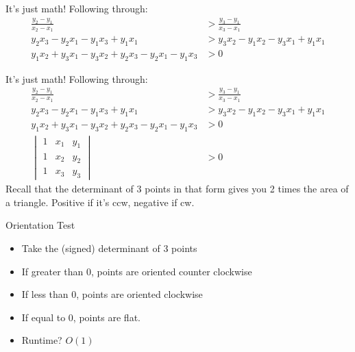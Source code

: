 \documentclass[aspectratio=169]{beamer}
\begin{document}
\begin{frame}{It's just math!}
    Following through:
    \begin{align*}
        \frac{y_2-y_1}{x_2-x_1} &> \frac{y_3 - y_1}{x_3-x_1} \\
        y_2x_3-y_2x_1-y_1x_3+y_1x_1 &> y_3x_2 - y_1x_2 - y_3x_1 + y_1x_1 \\
        y_1x_2+y_3x_1-y_3x_2+y_2x_3-y_2x_1-y_1x_3 &> 0
    \end{align*}
\end{frame}

\begin{frame}{It's just math!}
    Following through:
    \begin{align*}
        \frac{y_2-y_1}{x_2-x_1} &> \frac{y_3 - y_1}{x_3-x_1} \\
        y_2x_3-y_2x_1-y_1x_3+y_1x_1 &> y_3x_2 - y_1x_2 - y_3x_1 + y_1x_1 \\
        y_1x_2+y_3x_1-y_3x_2+y_2x_3-y_2x_1-y_1x_3 &> 0 \\ 
        \begin{vmatrix}
     1 & x_1 & y_1\\ 
     1 & x_2 & y_2\\
     1 & x_3 & y_3 
     \end{vmatrix} &> 0
    \end{align*}
    Recall that the determinant of 3 points in that form gives you 2 times the area of a triangle. Positive if it's ccw, negative if cw.
\end{frame}

\begin{frame}{Orientation Test}
    \begin{itemize}
        \item Take the (signed) determinant of 3 points
        \item If greater than 0, points are oriented counter clockwise
        \item If less than 0, points are oriented clockwise
        \item If equal to 0, points are flat. \pause
        \item Runtime? \pause $O(1)$
    \end{itemize}
\end{frame}
\end{document}
